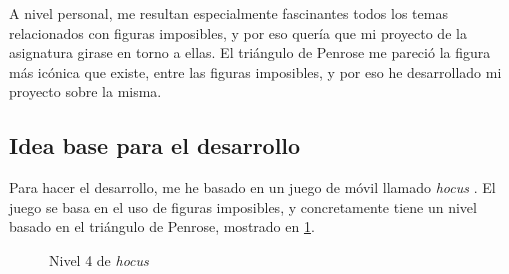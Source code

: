 \documentclass[a4paper,12pt]{article}
\begin{document}
A nivel personal, me resultan especialmente fascinantes todos los temas relacionados con figuras imposibles, y por eso quería que mi proyecto de la asignatura girase en torno a ellas. El triángulo de Penrose me pareció la figura más icónica que existe, entre las figuras imposibles, y por eso he desarrollado mi proyecto sobre la misma.

\subsection{Idea base para el desarrollo} \label{hocus}

Para hacer el desarrollo, me he basado en un juego de móvil llamado \textit{hocus} \cite{hocus}. El juego se basa en el uso de figuras imposibles, y concretamente tiene un nivel basado en el triángulo de Penrose, mostrado en \ref{nivel_hocus}.

\begin{figure}[h]
    \centering
    \caption{Nivel 4 de \textit{hocus}} \label{nivel_hocus}
\end{figure}
\end{document}
